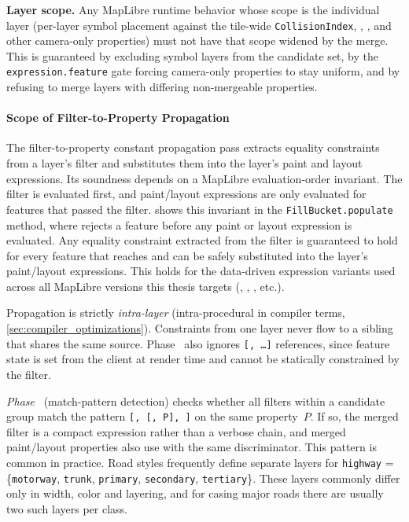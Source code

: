 \textbf{Layer scope.}
Any MapLibre runtime behavior whose scope is the individual layer (per-layer symbol placement against the tile-wide \texttt{CollisionIndex}, , , and other camera-only properties) must not have that scope widened by the merge.
This is guaranteed by excluding symbol layers from the candidate set, by the \texttt{expression.feature} gate forcing camera-only properties to stay uniform, and by refusing to merge layers with differing non-mergeable properties.

\paragraph{Scope of Filter-to-Property Propagation}
The filter-to-property constant propagation pass extracts equality constraints from a layer's filter and substitutes them into the layer's paint and layout expressions.
Its soundness depends on a MapLibre evaluation-order invariant.
The filter is evaluated first, and paint/layout expressions are only evaluated for features that passed the filter.
 shows this invariant in the \texttt{FillBucket.populate} method, where  rejects a feature before any paint or layout expression is evaluated.
Any equality constraint extracted from the filter is guaranteed to hold for every feature that reaches  and can be safely substituted into the layer's paint/layout expressions.
This holds for the data-driven expression variants used across all MapLibre versions this thesis targets (, , , etc.).

Propagation is strictly \emph{intra-layer} (intra-procedural in compiler terms, \cref{sec:compiler_optimizations}).
Constraints from one layer never flow to a sibling that shares the same source.
Phase~ also ignores \texttt{[, \ldots]} references, since feature state is set from the client at render time and cannot be statically constrained by the filter.

\emph{Phase}~ (match-pattern detection) checks whether all filters within a candidate group match the pattern \texttt{[,~[,~P],~]} on the same property~$P$.
If so, the merged filter is a compact  expression rather than a verbose  chain, and merged paint/layout properties also use  with the same discriminator.
This pattern is common in practice.
Road styles frequently define separate layers for \texttt{highway} = \{\texttt{motorway}, \texttt{trunk}, \texttt{primary}, \texttt{secondary}, \texttt{tertiary}\}.
These layers commonly differ only in width, color and layering, and for casing major roads there are usually two such layers per class.

